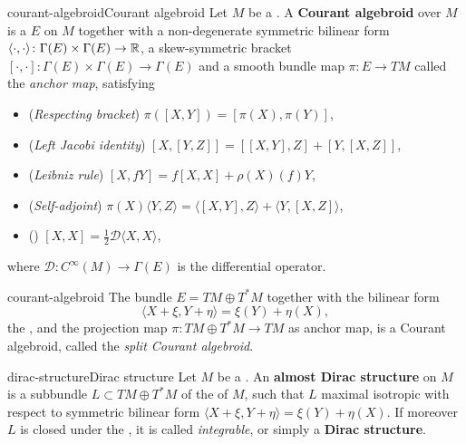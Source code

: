 \begin{topic}{courant-algebroid}{Courant algebroid}
    Let $M$ be a . A \textbf{Courant algebroid} over $M$ is a  $E$ on $M$ together with a non-degenerate symmetric bilinear form $\langle \cdot, \cdot \rangle \colon \Gamma(E) \times \Gamma(E) \to \mathbb{R}$, a skew-symmetric bracket $[\cdot, \cdot] \colon \Gamma(E) \times \Gamma(E) \to \Gamma(E)$ and a smooth bundle map $\pi \colon E \to TM$ called the \textit{anchor map}, satisfying
    \begin{itemize}
        \item (\textit{Respecting bracket}) $\pi([X, Y]) = [\pi(X), \pi(Y)]$,
        \item (\textit{Left Jacobi identity}) $[X, [Y, Z]] = [[X, Y], Z] + [Y, [X, Z]]$,
        \item (\textit{Leibniz rule}) $[X, fY] = f[X, X] + \rho(X)(f) Y$,
        \item (\textit{Self-adjoint}) $\pi(X) \langle Y, Z \rangle = \langle [X, Y], Z \rangle + \langle Y, [X, Z] \rangle$,
        \item (\textit{}) $[X, X] = \frac{1}{2} \mathcal{D} \langle X, X \rangle$,
    \end{itemize}
    where $\mathcal{D} \colon C^\infty(M) \to \Gamma(E)$ is the differential operator.
\end{topic}

\begin{example}{courant-algebroid}
    The bundle $E = TM \oplus T^*M$ together with the bilinear form
    \[ \langle X + \xi, Y + \eta \rangle = \xi(Y) + \eta(X) , \]
    the , and the projection map $\pi \colon TM \oplus T^*M \to TM$ as anchor map, is a Courant algebroid, called the \textit{split Courant algebroid}.
\end{example}

\begin{topic}{dirac-structure}{Dirac structure}
    Let $M$ be a . An \textbf{almost Dirac structure} on $M$ is a subbundle $L \subset TM \oplus T^*M$ of the  of $M$, such that $L$ maximal isotropic with respect to symmetric bilinear form $\langle X + \xi, Y + \eta \rangle = \xi(Y) + \eta(X)$. If moreover $L$ is closed under the , it is called \textit{integrable}, or simply a \textbf{Dirac structure}.
\end{topic}

